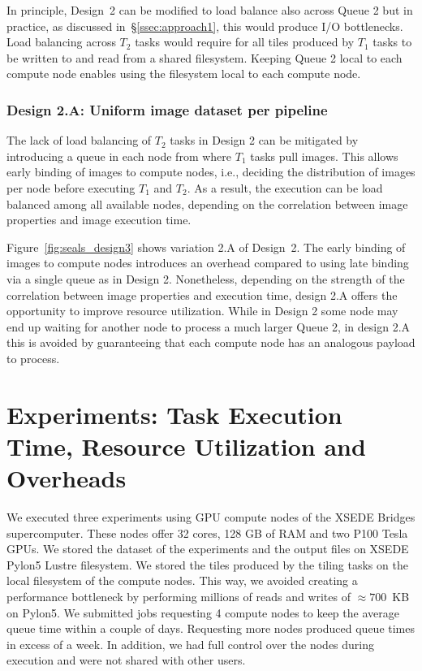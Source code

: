 In principle, Design~2 can be modified to load balance also across Queue 2 but
in practice, as discussed in~\S\ref{ssec:approach1}, this would produce I/O
bottlenecks. Load balancing across $T_{2}$ tasks would require for all tiles
produced by $T_{1}$ tasks to be written to and read  from a  shared filesystem.
Keeping Queue 2 local to each compute node enables using the filesystem local
to each compute node.

\subsubsection{Design 2.A: Uniform image dataset per pipeline}
\label{sssec:approach2a}

The lack of load balancing of $T_{2}$ tasks in Design 2 can be mitigated by
introducing a queue in each node from where $T_{1}$ tasks pull images. This
allows early binding of images to compute nodes, i.e., deciding the
distribution of images per node before executing $T_{1}$ and $T_{2}$. As a
result, the execution can be load balanced among all available nodes,
depending on the correlation between image properties and image execution time.

Figure~\ref{fig:seals_design3} shows variation 2.A of Design~2. The early
binding of images to compute nodes introduces an overhead compared to using
late binding via a single queue as in Design 2. Nonetheless, depending on the
strength of the correlation between image properties and execution time,
design 2.A offers the opportunity to improve resource utilization. While in
Design 2 some node may end up waiting for another node to process a much
larger Queue 2, in design 2.A this is avoided by guaranteeing that each
compute node has an analogous payload to process.

\section{Experiments: Task Execution Time, Resource Utilization and
Overheads}
\label{sec:des_experiments}

We executed three experiments using GPU compute nodes of the XSEDE Bridges
supercomputer. These nodes offer 32 cores, 128 GB of RAM and two P100 Tesla
GPUs. We stored the dataset of the experiments and the output files on XSEDE
Pylon5 Lustre filesystem. We stored the tiles produced by the tiling tasks on
the local filesystem of the compute nodes. This way, we avoided creating a
performance bottleneck by performing millions of reads and writes of
$\approx700$~KB on Pylon5. We submitted jobs requesting 4 compute nodes to
keep the average queue time within a couple of days. Requesting more nodes
produced queue times in excess of a week. In addition, we had full control
over the nodes during execution and were not shared with other users.

